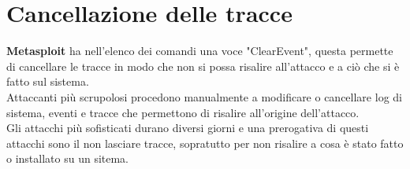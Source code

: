 \section{  Cancellazione delle tracce}

\textbf{Metasploit}\cite{metasploit} ha nell'elenco dei comandi una voce "ClearEvent", questa permette di cancellare le tracce in modo che non si possa risalire all'attacco e a ciò che si è fatto sul sistema.\\
Attaccanti più scrupolosi procedono manualmente  a modificare o cancellare log di sistema, eventi e tracce che permettono di risalire all'origine dell'attacco.\\
Gli attacchi più sofisticati durano diversi giorni e una prerogativa di questi attacchi sono il non lasciare tracce, sopratutto per non risalire a cosa è stato fatto o installato su un sitema.
